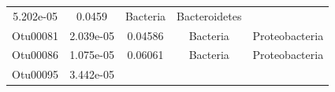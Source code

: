 \documentclass[]{article}
\begin{document}
\begin{longtable}[]{@{}ccccc@{}}
\begin{minipage}[t]{0.14\columnwidth}
5.202e-05\strut
\end{minipage} & \begin{minipage}[t]{0.12\columnwidth}\centering\strut
0.0459\strut
\end{minipage} & \begin{minipage}[t]{0.13\columnwidth}\centering\strut
Bacteria\strut
\end{minipage} & \begin{minipage}[t]{0.20\columnwidth}\centering\strut
Bacteroidetes\strut
\end{minipage}\tabularnewline
\begin{minipage}[t]{0.13\columnwidth}\centering\strut
Otu00081\strut
\end{minipage} & \begin{minipage}[t]{0.14\columnwidth}\centering\strut
2.039e-05\strut
\end{minipage} & \begin{minipage}[t]{0.12\columnwidth}\centering\strut
0.04586\strut
\end{minipage} & \begin{minipage}[t]{0.13\columnwidth}\centering\strut
Bacteria\strut
\end{minipage} & \begin{minipage}[t]{0.20\columnwidth}\centering\strut
Proteobacteria\strut
\end{minipage}\tabularnewline
\begin{minipage}[t]{0.13\columnwidth}\centering\strut
Otu00086\strut
\end{minipage} & \begin{minipage}[t]{0.14\columnwidth}\centering\strut
1.075e-05\strut
\end{minipage} & \begin{minipage}[t]{0.12\columnwidth}\centering\strut
0.06061\strut
\end{minipage} & \begin{minipage}[t]{0.13\columnwidth}\centering\strut
Bacteria\strut
\end{minipage} & \begin{minipage}[t]{0.20\columnwidth}\centering\strut
Proteobacteria\strut
\end{minipage}\tabularnewline
\begin{minipage}[t]{0.13\columnwidth}\centering\strut
Otu00095\strut
\end{minipage} & \begin{minipage}[t]{0.14\columnwidth}\centering\strut
3.442e-05\strut
\end{minipage} & \begin{minipage}[t]{0.12\columnwidth}\centering\strut

\end{minipage}
\end{longtable}
\end{document}
